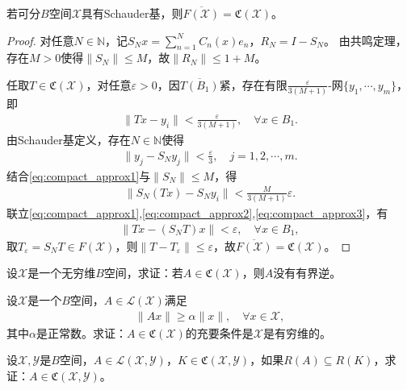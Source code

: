 \documentclass[../../main.tex]{subfiles}%
\begin{document}
\begin{theorem}
若可分$B$空间$\mathscr{X}$具有Schauder基，则$\overline{F(\mathscr{X})}=\mathfrak{C}(\mathscr{X})$。
\end{theorem}
\begin{proof}
对任意$N\in\mathbb{N}$，记$S_Nx=\sum\limits_{n=1}^{N}C_n(x)e_n$，$R_N=I-S_N$。
由共鸣定理，存在$M>0$使得$\|S_N\|\leqslant M$，故$\|R_N\|\leqslant1+M$。

任取$T\in\mathfrak{C}(\mathscr{X})$，对任意$\varepsilon>0$，因$\overline{T(B_1)}$紧，存在有限$\frac{\varepsilon}{3(M+1)}$-网$\{y_1,\cdots,y_m\}$，即
\begin{align}
\|Tx-y_i\|<\frac{\varepsilon}{3(M+1)},\quad \forall x\in B_1. \label{eq:compact_approx1}
\end{align}
由Schauder基定义，存在$N\in\mathbb{N}$使得
\begin{align}
\|y_j-S_Ny_j\|<\frac{\varepsilon}{3},\quad j=1,2,\cdots,m. \label{eq:compact_approx2}
\end{align}
结合\eqref{eq:compact_approx1}与$\|S_N\|\leqslant M$，得
\begin{align}
\|S_N(Tx)-S_Ny_i\|<\frac{M}{3(M+1)}\varepsilon. \label{eq:compact_approx3}
\end{align}
联立\eqref{eq:compact_approx1},\eqref{eq:compact_approx2},\eqref{eq:compact_approx3}，有
\begin{align*}
\|Tx-(S_NT)x\|<\varepsilon,\quad \forall x\in B_1,
\end{align*}
取$T_\varepsilon=S_NT\in F(\mathscr{X})$，则$\|T-T_\varepsilon\|\leqslant\varepsilon$，故$\overline{F(\mathscr{X})}=\mathfrak{C}(\mathscr{X})$。
\end{proof}

\begin{proposition}\label{proposition:无穷维空间上的紧算子没有有界逆}
设$\mathscr{X}$是一个无穷维$B$空间，求证：若$A\in\mathfrak{C}(\mathscr{X})$，则$A$没有有界逆。
\end{proposition}

\begin{example}
设$\mathscr{X}$是一个$B$空间，$A\in\mathscr{L}(\mathscr{X})$满足
\begin{align*}
\|Ax\|\geqslant\alpha\|x\|,\quad \forall x\in\mathscr{X},
\end{align*}
其中$\alpha$是正常数。求证：$A\in\mathfrak{C}(\mathscr{X})$的充要条件是$\mathscr{X}$是有穷维的。
\end{example}

\begin{example}
设$\mathscr{X},\mathscr{Y}$是$B$空间，$A\in\mathscr{L}(\mathscr{X},\mathscr{Y})$，$K\in\mathfrak{C}(\mathscr{X},\mathscr{Y})$，如果$R(A)\subseteq R(K)$，求证：$A\in\mathfrak{C}(\mathscr{X},\mathscr{Y})$。
\end{example}
\end{document}
